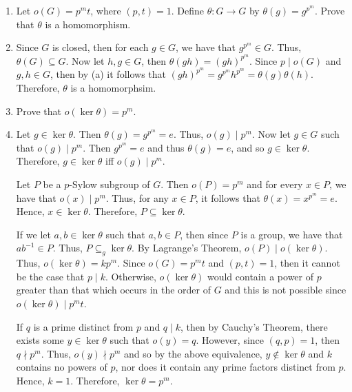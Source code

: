 \documentclass[12pt]{article}
\makeatletter
\theoremstyle{definition}
\theoremstyle{remark}
\renewenvironment{proof}[1][\proofname]{\par
  \pushQED{\qed}%
  \normalfont \topsep6\p@\@plus6\p@\relax
  \list{}{\leftmargin=0mm
          \rightmargin=4mm
          \settowidth{\itemindent}{\itshape#1}%
          \labelwidth=\itemindent
          \parsep=0pt \listparindent=\parindent 
  }
  \item[\hskip\labelsep
        \itshape
    #1\@addpunct{.}]\ignorespaces
}{%
  \popQED\endlist\@endpefalse
}
\let\oldproofname=\proofname
\renewcommand{\proofname}{\bf{\textit{\oldproofname}}}
\makeatother
\begin{document}
\begin{enumerate}[leftmargin=*]
\begin{enumerate}[label=(\alph*)]
                    \item Let $o(G)=p^mt$, where $(p,t)=1$. Define $\theta\colon G\rightarrow G$ by $\theta(g)=g^{p^m}$. Prove that $\theta$ is a homomorphism.
                        \begin{proof}
                            Since $G$ is closed, then for each $g\in G$, we have that $g^{p^m}\in G$. Thus, $\theta(G)\subseteq G$. Now let $h,g\in G$, then $\theta(gh)=(gh)^{p^m}$. Since $p\mid o(G)$ and $g,h\in G$, then by (a) it follows that $(gh)^{p^m}=g^{p^m}h^{p^m}=\theta(g)\theta(h)$. Therefore, $\theta$ is a homomorphsim.
                        \end{proof}
                        
                    \item Prove that $o(\ker\theta)=p^m$.
                        \begin{proof}
                            Let $g\in\ker\theta$. Then $\theta(g)=g^{p^m}=e$. Thus, $o(g)\mid p^m$. Now let $g\in G$ such that $o(g)\mid p^m$. Then $g^{p^m}=e$ and thus $\theta(g)=e$, and so $g\in\ker\theta$. Therefore, $g\in\ker\theta$ iff $o(g)\mid p^m$.\par\hspace{4mm} Let $P$ be a $p$-Sylow subgroup of $G$. Then $o(P)=p^m$ and for every $x\in P$, we have that $o(x)\mid p^m$. Thus, for any $x\in P$, it follows that $\theta(x)=x^{p^m}=e$. Hence, $x\in\ker\theta$. Therefore, $P\subseteq\ker\theta$.\par\hspace{4mm} If we let $a,b\in\ker\theta$ such that $a,b\in P$, then since $P$ is a group, we have that $ab^{-1}\in P$. Thus, $P\subseteq_g\ker\theta$. By Lagrange's Theorem, $o(P)\mid o(\ker\theta)$. Thus, $o(\ker\theta)=kp^m$. Since $o(G)=p^mt$ and $(p,t)=1$, then it cannot be the case that $p\mid k$. Otherwise, $o(\ker\theta)$ would contain a power of $p$ greater than that which occurs in the  order of $G$ and this is not possible since $o(\ker\theta)\mid p^mt$.\par\hspace{4mm} If $q$ is a prime distinct from $p$ and $q\mid k$, then by Cauchy's Theorem, there exists some $y\in\ker\theta$ such that $o(y)=q$. However, since $(q,p)=1$, then $q\nmid p^m$. Thus, $o(y)\nmid p^m$ and so by the above equivalence, $y\notin\ker\theta$ and $k$ contains no powers of $p$, nor does it contain any prime factors distinct from $p$. Hence, $k=1$. Therefore, $\ker\theta=p^m$.
                        \end{proof}
                    

\end{enumerate}
\end{enumerate}
\end{document}
